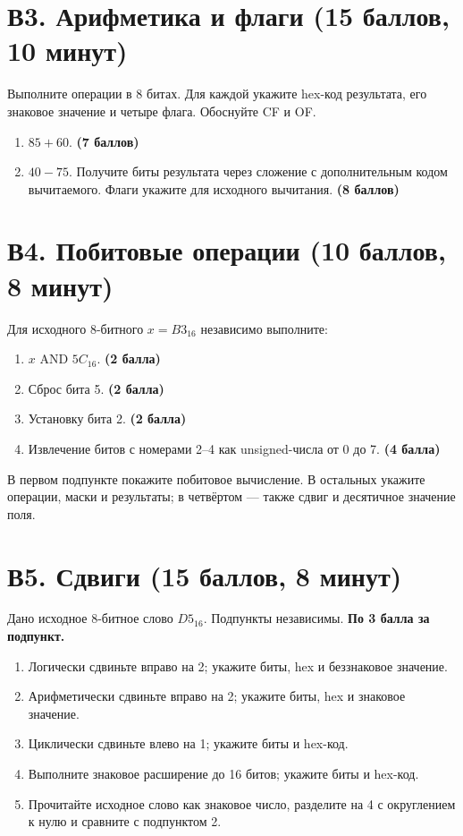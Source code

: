\section{В3. Арифметика и флаги (15 баллов, 10 минут)}\label{task:v3}
Выполните операции в 8 битах. Для каждой укажите hex-код результата, его знаковое значение и четыре флага. Обоснуйте CF и OF.
\begin{enumerate}
    \item $85+60$. \textbf{(7 баллов)}
    \item $40-75$. Получите биты результата через сложение с дополнительным кодом вычитаемого. Флаги укажите для исходного вычитания. \textbf{(8 баллов)}
\end{enumerate}

\section{В4. Побитовые операции (10 баллов, 8 минут)}\label{task:v4}
Для исходного 8-битного $x=B3_{16}$ независимо выполните:
\begin{enumerate}
    \item $x$ AND $5C_{16}$. \textbf{(2 балла)}
    \item Сброс бита 5. \textbf{(2 балла)}
    \item Установку бита 2. \textbf{(2 балла)}
    \item Извлечение битов с номерами 2--4 как unsigned-числа от 0 до 7. \textbf{(4 балла)}
\end{enumerate}
В первом подпункте покажите побитовое вычисление. В остальных укажите операции, маски и результаты; в четвёртом --- также сдвиг и десятичное значение поля.

\section{В5. Сдвиги (15 баллов, 8 минут)}\label{task:v5}
Дано исходное 8-битное слово $D5_{16}$. Подпункты независимы. \textbf{По 3 балла за подпункт.}
\begin{enumerate}
    \item Логически сдвиньте вправо на 2; укажите биты, hex и беззнаковое значение.
    \item Арифметически сдвиньте вправо на 2; укажите биты, hex и знаковое значение.
    \item Циклически сдвиньте влево на 1; укажите биты и hex-код.
    \item Выполните знаковое расширение до 16 битов; укажите биты и hex-код.
    \item Прочитайте исходное слово как знаковое число, разделите на 4 с округлением к нулю и сравните с подпунктом 2.
\end{enumerate}

